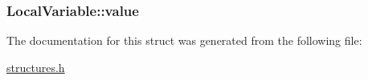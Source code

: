 \subsubsection[{\texorpdfstring{value}{value}}]{ Local\+Variable\+::value}\hypertarget{structLocalVariable_aee58138d840bf24f71cd8c4fd2f84db7}{}\label{structLocalVariable_aee58138d840bf24f71cd8c4fd2f84db7}


The documentation for this struct was generated from the following file\+:\begin{DoxyCompactItemize}
\item 
\hyperlink{structures_8h}{structures.\+h}\end{DoxyCompactItemize}
